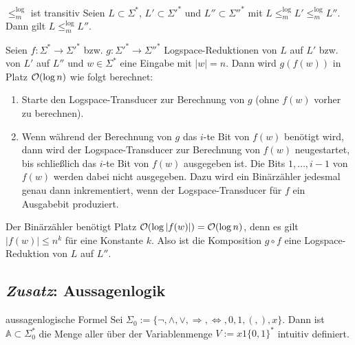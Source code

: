 \begin{Satz}{$\le_m^{\log}$ ist transitiv}
    Seien $L \subset \Sigma^\ast$, $L' \subset \Sigma'^\ast$ und $L'' \subset \Sigma''^\ast$
    mit $L \le_m^{\log} L' \le_m^{\log} L''$.\\
    Dann gilt $L \le_m^{\log} L''$.
\end{Satz}

\begin{Beweis}
    Seien $f\colon \Sigma^\ast \rightarrow \Sigma'^\ast$ bzw.
    $g\colon \Sigma'^\ast \rightarrow \Sigma''^\ast$ Logspace-Reduktionen von $L$ auf $L'$
    bzw. von $L'$ auf $L''$ und $w \in \Sigma^\ast$ eine Eingabe mit $|w| = n$.
    Dann wird $g(f(w))$ in Platz $\mathcal{O}(\log n)$ wie folgt berechnet:
    \begin{enumerate}
        \item
        Starte den Logspace-Transducer zur Berechnung von $g$ (ohne $f(w)$ vorher zu berechnen).

        \item
        Wenn während der Berechnung von $g$ das $i$-te Bit von $f(w)$ benötigt wird,
        dann wird der Logspace-Transducer zur Berechnung von $f(w)$ neugestartet,
        bis schließlich das $i$-te Bit von $f(w)$ ausgegeben ist.
        Die Bits $1, \dotsc, i - 1$ von $f(w)$ werden dabei nicht ausgegeben.
        Dazu wird ein Binärzähler jedesmal genau dann inkrementiert, wenn
        der Logspace-Transducer für $f$ ein Ausgabebit produziert.
    \end{enumerate}
    Der Binärzähler benötigt Platz $\mathcal{O}(\log |f(w)|) = \mathcal{O}(\log n)$,
    denn es gilt $|f(w)| \le n^k$ für eine Konstante $k$.
    Also ist die Komposition $g \circ f$ eine Logspace-Reduktion von $L$ auf $L''$.
\end{Beweis}

\pagebreak

\subsection{%
    \emph{Zusatz}: Aussagenlogik%
}

\begin{Def}{aussagenlogische Formel}
    Sei $\Sigma_0 := \{\lnot, \land, \lor, \Rightarrow, \Leftrightarrow, 0, 1,
    (, ), x\}$.
    Dann ist $\mathbb{A} \subset \Sigma_0^\ast$ die Menge aller 
    über der Variablenmenge $V := x1\{0, 1\}^\ast$ intuitiv definiert.
\end{Def}


